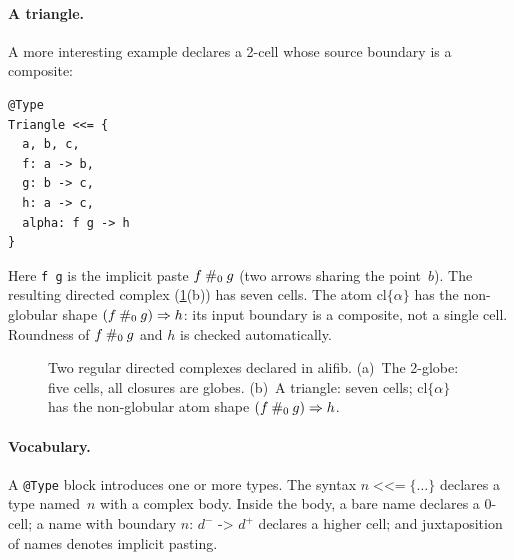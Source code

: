 \documentclass[acmsmall,screen,nonacm]{acmart}
\begin{document}
\paragraph{A triangle.}
A more interesting example declares a 2-cell whose source boundary is
a composite:
\begin{verbatim}
@Type
Triangle <<= {
  a, b, c,
  f: a -> b,
  g: b -> c,
  h: a -> c,
  alpha: f g -> h
}
\end{verbatim}
Here \texttt{f g} is the implicit paste $f \mathbin{\#_{0}} g$ (two arrows
sharing the point~$b$).  The resulting directed complex
(\cref{fig:example:complexes}(b)) has seven cells.  The atom
$\mathrm{cl}\{\alpha\}$ has the non-globular shape
$(f \mathbin{\#_{0}} g) \Rightarrow h$: its input boundary is a composite,
not a single cell.  Roundness of $f \mathbin{\#_{0}} g$ and $h$ is checked
automatically.

\begin{figure}[t]
\centering
{}
\caption{Two regular directed complexes declared in \textsf{alifib}.
  (a)~The 2-globe: five cells, all closures are globes.
  (b)~A triangle: seven cells; $\mathrm{cl}\{\alpha\}$ has the
  non-globular atom shape $(f \mathbin{\#_{0}} g) \Rightarrow h$.}
\label{fig:example:complexes}
\end{figure}

\paragraph{Vocabulary.}
A \texttt{@Type} block introduces one or more types. The syntax
$n \;\texttt{<<=}\; \{\ldots\}$ declares a type named~$n$ with a
complex body.  Inside the body, a bare name declares a 0-cell; a
name with boundary $n\texttt{: } d^- \texttt{ -> } d^+$ declares a
higher cell; and juxtaposition of names denotes implicit pasting.
\end{document}
